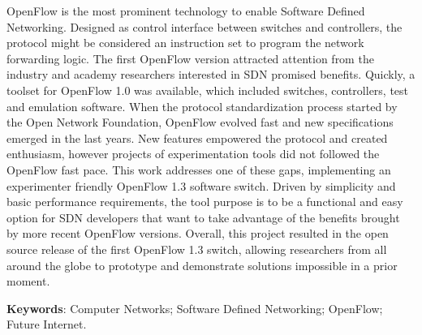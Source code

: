 \begin{resumo}
    OpenFlow is the most prominent technology to enable Software Defined Networking. Designed as control interface between switches and controllers, the protocol might be considered an instruction set to program the network forwarding logic. The first OpenFlow version attracted attention from the industry and academy researchers interested in SDN promised benefits. Quickly, a toolset for OpenFlow 1.0 was available, which included switches, controllers, test and emulation software. When the protocol standardization process started by the Open Network Foundation, OpenFlow evolved fast and new specifications emerged in the last years. New features empowered the protocol and created enthusiasm, however projects of experimentation tools did not followed the OpenFlow fast pace. This work addresses one of these gaps, implementing an experimenter friendly OpenFlow 1.3 software switch. Driven by simplicity and basic performance requirements, the tool purpose is to be a functional and easy option for SDN developers that want to take advantage of the benefits brought by more recent OpenFlow versions. Overall, this project resulted in the open source release of the first OpenFlow 1.3 switch, allowing researchers from all around the globe to prototype and demonstrate solutions impossible in a prior moment. 
    \vspace{\onelineskip}


    \noindent\textbf{Keywords}: Computer Networks; Software Defined Networking; OpenFlow; Future Internet.

    \pagebreak


\end{resumo}
